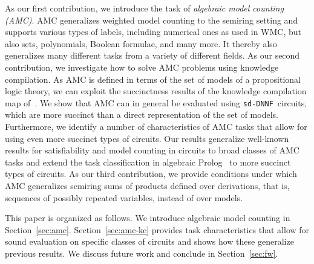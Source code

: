 \documentclass{article}
\theoremstyle{plain}
\theoremstyle{definition}
\newcommand{\sdDNNF}{{\tt sd-DNNF}}
\begin{document}
As our first contribution, we introduce the task of
\emph{algebraic model counting (AMC)}.  AMC generalizes weighted
model counting to the semiring setting and supports various
types of labels,  including numerical ones as used in WMC,  but also sets,
polynomials, Boolean formulae, and many more. It thereby also  
generalizes many different tasks from a variety of different
fields.  
As our second contribution,  we investigate how to solve AMC problems
using knowledge compilation. As  AMC is defined in
terms of the set of models of a propositional logic theory, we can
exploit the succinctness results of 
the knowledge compilation map of~\citet{darwiche2002knowledge}.
We show that AMC can in general be  evaluated using \sdDNNF\ circuits,
which are more succinct than a direct representation of the set of models.  Furthermore, we
identify a number of characteristics of AMC tasks that allow for using
even more succinct types of circuits. 
Our results generalize well-known
results for satisfiability and model counting in circuits to broad classes of AMC tasks
and extend the task classification in algebraic Prolog~\citep{Kimmig11}
to more succinct types of circuits. 
As our third contribution,  we provide conditions under which AMC
generalizes 
semiring sums of products defined over derivations, that is,
sequences of possibly repeated variables, instead of over models.

This paper is organized as follows. We introduce algebraic model
counting in Section~\ref{sec:amc}. Section~\ref{sec:amc-kc} provides
task characteristics that allow for sound evaluation on specific
classes of circuits and shows how these generalize previous results. We
discuss future work and conclude in Section~\ref{sec:fw}.
\end{document}
